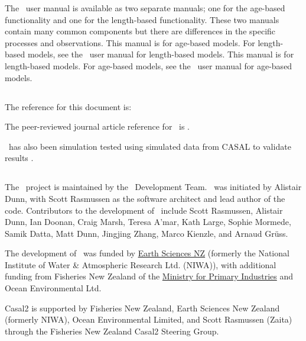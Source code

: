 The \CNAME\ user manual is available as two separate manuals; one for the age-based functionality and one for the length-based functionality. These two manuals contain many common components but there are differences in the specific processes and observations. 
\ifAgeBased 
This manual is for age-based models. For length-based models, see the \CNAME\ user manual for length-based models. 
\else
This manual is for length-based models. For age-based models, see the \CNAME\ user manual for age-based models. 
\fi %

\subsection{}

The reference for this document is: \ManualRef

The peer-reviewed journal article reference for \CNAME\ is \cite{doonan_casal2}.

\CNAME\ has also been simulation tested using simulated data from CASAL to validate results \citep{dunn_integrated_2022}.

\subsection{}

The \CNAME\ project is maintained by the \CNAME\ Development Team. \CNAME\ was initiated by Alistair Dunn, with Scott Rasmussen as the software architect and lead author of the code. Contributors to the development of \CNAME\ include Scott Rasmussen, Alistair Dunn, Ian Doonan, Craig Marsh, Teresa A'mar, Kath Large, Sophie Mormede, Samik Datta, Matt Dunn, Jingjing Zhang, Marco Kienzle, and Arnaud Gr\"uss.

The development of \CNAME\ was funded by \href{https://www.earthsciences.nz/}{Earth Sciences NZ} (formerly the National Institute of Water \& Atmospheric Research Ltd. (NIWA)), with additional funding from Fisheries New Zealand of the \href{http://www.mpi.govt.nz}{Ministry for Primary Industries} and Ocean Environmental Ltd.

Casal2 is supported by Fisheries New Zealand, Earth Sciences New Zealand (formerly NIWA), Ocean Environmental Limited, and Scott Rasmussen (Zaita) through the Fisheries New Zealand Casal2 Steering Group.

\subsection{}

